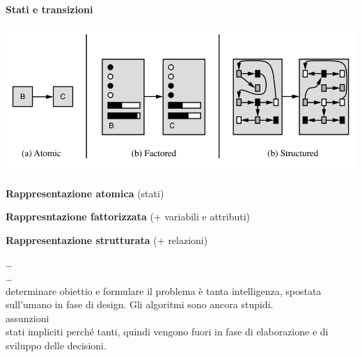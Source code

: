 \documentclass[10pt]{book}
\begin{document}
\paragraph{Stati e transizioni}
\begin{center}
	\includegraphics[scale=0.75]{rapprstatitransizioni.png}
\end{center}
\begin{list}{}{}
	\item \textbf{Rappresentazione atomica} (stati)
	\item \textbf{Rappresntazione fattorizzata} ($+$ variabili e attributi)
	\item \textbf{Rappresentazione strutturata} ($+$ relazioni)
\end{list}
\pagebreak

\ldots\\
\ldots\\
determinare obiettio e formulare il problema è tanta intelligenza, spostata sull'umano in fase di design. Gli algoritmi sono ancora stupidi.\\
assunzioni\\
stati impliciti perché tanti, quindi vengono fuori in fase di elaborazione e di sviluppo delle decisioni.\\
\end{document}
